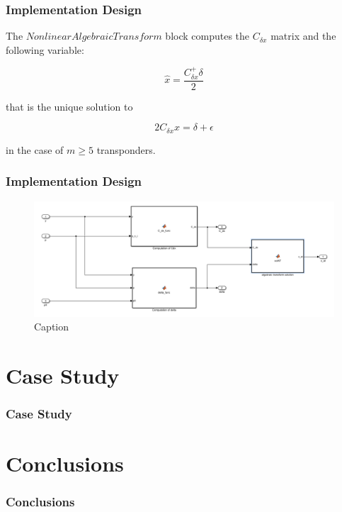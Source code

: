 \documentclass{beamer}
\begin{document}
	\begin{frame}
		\frametitle{Implementation Design}
		The $Nonlinear Algebraic Transform$ block computes the $C_{\delta x}$ matrix and the following variable:
		
		\[\hat{x} = \frac {C_{\delta x}^{+} \delta}{2}  \]
		
		that is the unique solution to
		
		\[ 2C_{\delta x} x = \delta + \epsilon \]
		
		in the case of $m \geqslant 5$ transponders.
	\end{frame}
	\begin{frame}
		\frametitle{Implementation Design}
			\begin{figure}
		    \centering
		    \includegraphics[scale = 0.25]{NLAT}
		    \caption{Caption}
		    \label{fig:my_label}
		\end{figure}
	\end{frame}



\section{Case Study}
    \begin{frame}
    \frametitle{Case Study}
    \end{frame}



\section{Conclusions}
    \begin{frame}
    \frametitle{Conclusions}
    \end{frame}
\end{document}
